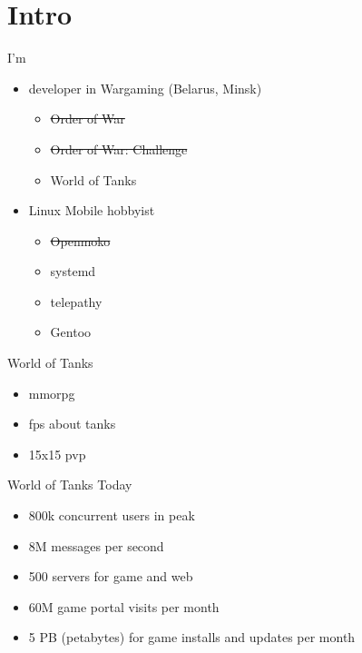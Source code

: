 \documentclass[aspectratio=169]{beamer}
\begin{document}
\section{Intro}
\begin{frame}{I'm}
    \begin{itemize}
        \item developer in Wargaming (Belarus, Minsk)
            \begin{itemize}
                \item \sout{Order of War}
                \item \sout{Order of War: Challenge}
                \item World of Tanks
            \end{itemize}

        \item Linux Mobile hobbyist
            \begin{itemize}
                \item \sout{Openmoko}
                \item systemd
                \item telepathy
                \item Gentoo
            \end{itemize}
    \end{itemize}
\end{frame}

\begin{frame}{World of Tanks}
    \begin{itemize}
        \item mmorpg
        \item fps about tanks
        \item 15x15 pvp 
    \end{itemize}
\end{frame}

\begin{frame}{World of Tanks Today}
    \begin{itemize}
        \item 800k concurrent users in peak
        \item 8M messages per second
        \item 500 servers for game and web
        \item 60M game portal visits per month
        \item 5 PB (petabytes) for game installs and updates per month
    \end{itemize}
\end{frame}
\end{document}
